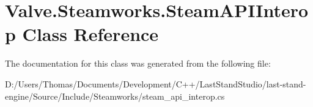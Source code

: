 \hypertarget{classValve_1_1Steamworks_1_1SteamAPIInterop}{}\section{Valve.\+Steamworks.\+Steam\+A\+P\+I\+Interop Class Reference}
\label{classValve_1_1Steamworks_1_1SteamAPIInterop}


The documentation for this class was generated from the following file\+:\begin{DoxyCompactItemize}
\item 
D\+:/\+Users/\+Thomas/\+Documents/\+Development/\+C++/\+Last\+Stand\+Studio/last-\/stand-\/engine/\+Source/\+Include/\+Steamworks/steam\+\_\+api\+\_\+interop.\+cs\end{DoxyCompactItemize}
